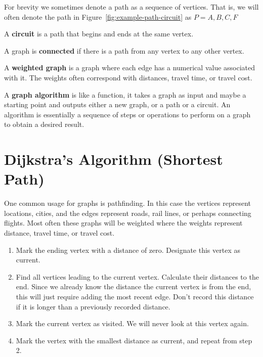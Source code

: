 \begin{note}
  For brevity we sometimes denote a path as a sequence of vertices.
  That is, we will often denote the path in
  Figure~\ref{fig:example-path-circuit} as \(P=A,B,C,F\)
\end{note}

\begin{definition}
  A \textbf{circuit} is a path that begins and ends at the same
  vertex.
\end{definition}

\newpage

\begin{definition}
  A graph is \textbf{connected} if there is a path from any vertex to
  any other vertex.
\end{definition}

\begin{definition}
  A \textbf{weighted graph} is a graph where each edge has a numerical
  value associated with it. The weights often correspond with
  distances, travel time, or travel cost.
\end{definition}

\begin{definition}
  A \textbf{graph algorithm} is like a function, it takes a graph as
  input and maybe a starting point and outputs either a new graph, or
  a path or a circuit. An algorithm is essentially a sequence of steps
  or operations to perform on a graph to obtain a desired result.
\end{definition}

\section{Dijkstra's Algorithm (Shortest Path)}%
\label{sec:dijkstras-algorithm}

One common usage for graphs is pathfinding. In this case the vertices
represent locations, \eg{} cities, and the edges represent roads, rail
lines, or perhaps connecting flights. Most often these graphs will be
weighted where the weights represent distance, travel time, or travel
cost.

\begin{algorithm}
  \begin{enumerate}
  \item Mark the ending vertex with a distance of zero. Designate this
    vertex as current.

  \item Find all vertices leading to the current vertex. Calculate
    their distances to the end. Since we already know the distance the
    current vertex is from the end, this will just require adding the
    most recent edge. Don't record this distance if it is longer than
    a previously recorded distance.

  \item Mark the current vertex as visited. We will never look at this
    vertex again.

  \item Mark the vertex with the smallest distance as current, and
    repeat from step 2.
  \end{enumerate}
\end{algorithm}

